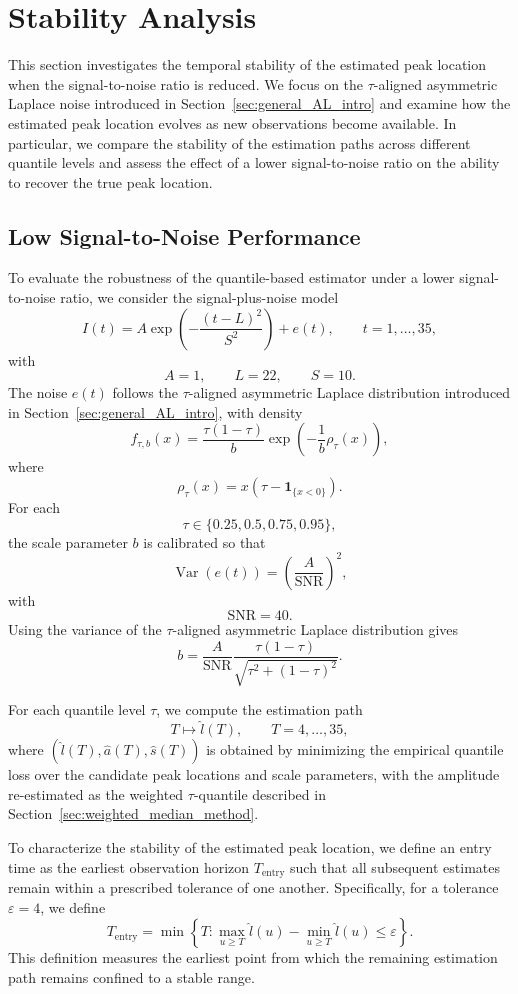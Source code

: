 \documentclass[12pt,a4paper]{article}
\begin{document}
	{\color{blue}
		\section{Stability Analysis}
		\label{sec:stability-analysis}
		
		This section investigates the temporal stability of the estimated peak location when the signal-to-noise ratio is reduced. We focus on the $\tau$-aligned asymmetric Laplace noise introduced in Section~\ref{sec:general_AL_intro} and examine how the estimated peak location evolves as new observations become available. In particular, we compare the stability of the estimation paths across different quantile levels and assess the effect of a lower signal-to-noise ratio on the ability to recover the true peak location.
		
		\subsection{Low Signal-to-Noise Performance}
		\label{subsec:low-snr}
		
		To evaluate the robustness of the quantile-based estimator under a lower signal-to-noise ratio, we consider the signal-plus-noise model
		\[
		I(t)
		=
		A\exp\left(-\frac{(t-L)^2}{S^2}\right)+e(t),
		\qquad t=1,\ldots,35,
		\]
		with
		\[
		A=1,\qquad L=22,\qquad S=10.
		\]
		The noise $e(t)$ follows the $\tau$-aligned asymmetric Laplace distribution introduced in Section~\ref{sec:general_AL_intro}, with density
		\[
		f_{\tau,b}(x)
		=
		\frac{\tau(1-\tau)}{b}
		\exp\left(-\frac{1}{b}\rho_\tau(x)\right),
		\]
		where
		\[
		\rho_\tau(x)
		=
		x\left(\tau-\mathbf{1}_{\{x<0\}}\right).
		\]
		For each
		\[
		\tau\in\{0.25,0.5,0.75,0.95\},
		\]
		the scale parameter $b$ is calibrated so that
		\[
		\operatorname{Var}(e(t))
		=
		\left(\frac{A}{\mathrm{SNR}}\right)^2,
		\]
		with
		\[
		\mathrm{SNR}=40.
		\]
		Using the variance of the $\tau$-aligned asymmetric Laplace distribution gives
		\[
		b
		=
		\frac{A}{\mathrm{SNR}}
		\frac{\tau(1-\tau)}
		{\sqrt{\tau^2+(1-\tau)^2}}.
		\]
		
		For each quantile level $\tau$, we compute the estimation path
		\[
		T\mapsto\hat{l}(T),
		\qquad T=4,\ldots,35,
		\]
		where $(\hat{l}(T),\hat{a}(T),\hat{s}(T))$ is obtained by minimizing the empirical quantile loss over the candidate peak locations and scale parameters, with the amplitude re-estimated as the weighted $\tau$-quantile described in Section~\ref{sec:weighted_median_method}.
		
		To characterize the stability of the estimated peak location, we define an entry time as the earliest observation horizon $T_{\mathrm{entry}}$ such that all subsequent estimates remain within a prescribed tolerance of one another. Specifically, for a tolerance $\varepsilon=4$, we define
		\[
		T_{\mathrm{entry}}
		=
		\min
		\left\{
		T:
		\max_{u\geq T}\hat{l}(u)
		-
		\min_{u\geq T}\hat{l}(u)
		\leq \varepsilon
		\right\}.
		\]
		This definition measures the earliest point from which the remaining estimation path remains confined to a stable range.
		
}
\end{document}

